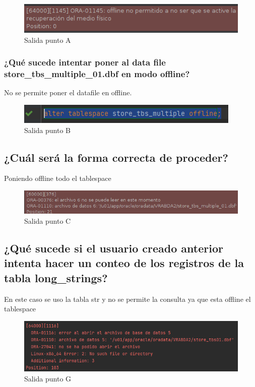 \documentclass[journal]{IEEEtran}
\begin{document}
\begin{figure}[H]
  \centering
  \includegraphics[scale=.35]{captura_a.png}
   \caption{Salida punto A}
   \label{fig:validador_1}
\end{figure}
\subsubsection{¿Qué sucede intentar poner al data file store\_tbs\_multiple\_01.dbf en modo offline?}
No se permite poner el datafile en offline.
\begin{figure}[H]
  \centering
  \includegraphics[scale=.35]{captura_b.png}
   \caption{Salida punto B}
   \label{fig:validador_2}
\end{figure}
\subsection{¿Cuál será la forma correcta de proceder?}
Poniendo offline todo el tablespace
\begin{figure}[H]
  \centering
  \includegraphics[scale=.35]{captura_c.png}
   \caption{Salida punto C}
   \label{fig:validador_3}
\end{figure}
\subsection{¿Qué sucede si el usuario creado anterior intenta hacer un conteo de los registros de la tabla long\_strings?}
En este caso se uso la tabla str y no se permite la consulta ya que esta offline el tablespace
\begin{figure}[H]
  \centering
  \includegraphics[scale=.35]{captura_g-1.png}
   \caption{Salida punto G}
   \label{fig:validador_4}
\end{figure}
\end{document}

